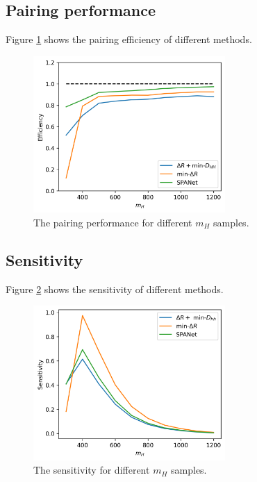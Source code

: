 \documentclass[12pt]{article}
\begin{document}
	\subsection{Pairing performance}%
	\label{sub:pairing_performance}
		
		Figure \ref{fig:pairing_performance_mass} shows the pairing efficiency of different methods.

		\begin{figure}[htpb]
			\centering
			\includegraphics[width=0.65\textwidth]{pairing_efficiency_resonant-DHH-mindR-SPANet2.png}
			\caption{The pairing performance for different $m_H$ samples.}
			\label{fig:pairing_performance_mass}
		\end{figure}

	\subsection{Sensitivity}%
	\label{sub:sensitivity}
		Figure \ref{fig:sensitivity_mass} shows the sensitivity of different methods.

		\begin{figure}[htpb]
			\centering
			\includegraphics[width=0.65\textwidth]{sensitivity_mass-DHH_mindR-SPANet.png}
			\caption{The sensitivity for different $m_H$ samples.}
			\label{fig:sensitivity_mass}
		\end{figure}
\end{document}

